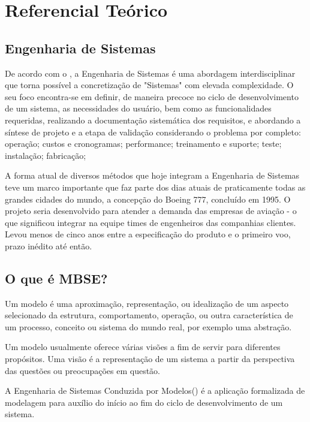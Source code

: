 \chapter{Referencial Teórico}

\section{Engenharia de Sistemas}

De acordo com o \cite{INCOSE200402}, a Engenharia de Sistemas é uma abordagem interdisciplinar que torna possível a concretização de "Sistemas" com elevada complexidade. O seu foco encontra-se em definir, de maneira precoce no ciclo de desenvolvimento de um sistema, as necessidades do usuário, bem como as funcionalidades requeridas, realizando a documentação sistemática dos requisitos, e abordando a síntese de projeto e a etapa de validação considerando o problema por completo: operação; custos e cronogramas; performance; treinamento e suporte; teste; instalação; fabricação;

A forma atual de diversos métodos que hoje integram a Engenharia de Sistemas teve um marco importante que faz parte dos dias atuais de praticamente todas as grandes cidades do mundo, a concepção do Boeing 777, concluído em 1995. O projeto seria desenvolvido para atender a demanda das empresas de aviação - o que significou integrar na equipe times de engenheiros das companhias clientes. Levou menos de cinco anos entre a especificação do produto e o primeiro voo, prazo inédito até então. \cite{EngSisUFMG}

\section{O que é MBSE?}

Um modelo é uma aproximação, representação, ou idealização de um aspecto selecionado da estrutura, comportamento, operação, ou outra característica de um processo, conceito ou sistema do mundo real, por exemplo uma abstração.\cite{IEEE61012}

Um modelo usualmente oferece várias visões a fim de servir para diferentes propósitos. Uma visão é a representação de um sistema a partir da perspectiva das questões ou preocupações em questão. \cite{IEEE1471}

A Engenharia de Sistemas Conduzida por Modelos() é a aplicação formalizada de modelagem para auxílio do início ao fim do ciclo de desenvolvimento de um sistema.\cite{INCOSE200402}

